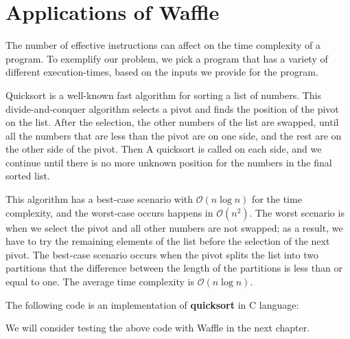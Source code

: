 \section{Applications of Waffle}
\label{sec:3-2}

The number of effective instructions can affect on the time complexity of a program. To exemplify our problem, we pick a program that has a variety of different execution-times, based on the inputs we provide for the program. 

Quicksort \cite{hoare1962quicksort} is a well-known fast algorithm for sorting a list of numbers. This divide-and-conquer algorithm selects a pivot and finds the position of the pivot on the list. After the selection, the other numbers of the list are swapped, until all the numbers that are less than the pivot are on one side, and the rest are on the other side of the pivot. Then A quicksort is called on each side, and we continue until there is no more unknown position for the numbers in the final sorted list.

This algorithm has a best-case scenario with $\mathcal{O}(n\log{}n)$ for the time complexity, and the worst-case occurs happens in $\mathcal{O}(n^2)$. The worst scenario is when we select the pivot and all other numbers are not swapped; as a result, we have to try the remaining elements of the list before the selection of the next pivot. The best-case scenario occurs when the pivot splits the list into two partitions that the difference between the length of the partitions is less than or equal to one. The average time complexity is $\mathcal{O}(n\log{}n)$.

The following code is an implementation of \textbf{quicksort} in C language:



We will consider testing the above code with Waffle in the next chapter.
